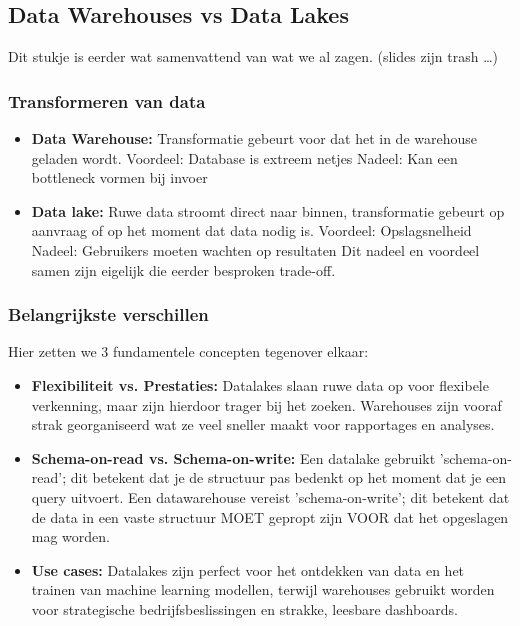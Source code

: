 \documentclass[a4paper,11pt,twoside]{report}
\begin{document}
\subsection{Data Warehouses vs Data Lakes}
Dit stukje is eerder wat samenvattend van wat we al zagen. (slides zijn trash \dots)
\subsubsection{Transformeren van data}
\begin{itemize}
    \item \textbf{Data Warehouse:} Transformatie gebeurt voor dat het in de warehouse geladen wordt.
          \newline
          {\color{green} Voordeel:} Database is extreem netjes
          \newline
          {\color{red} Nadeel:} Kan een bottleneck vormen bij invoer
    \item \textbf{Data lake:} Ruwe data stroomt direct naar binnen, transformatie gebeurt op
    aanvraag of op het moment dat data nodig is.
          \newline
          {\color{green} Voordeel:} Opslagsnelheid
          \newline
          {\color{red} Nadeel:} Gebruikers moeten wachten op resultaten
          \newline
          Dit nadeel en voordeel samen zijn eigelijk die eerder besproken trade-off.
\end{itemize}
\subsubsection{Belangrijkste verschillen}
Hier zetten we 3 fundamentele concepten tegenover elkaar:
\begin{itemize}
    \item \textbf{Flexibiliteit vs. Prestaties:} Datalakes slaan ruwe data op voor flexibele
    verkenning, maar zijn hierdoor trager bij het zoeken. Warehouses zijn vooraf strak georganiseerd
    wat ze veel sneller maakt voor rapportages en analyses.
    \item \textbf{Schema-on-read vs. Schema-on-write:} Een datalake gebruikt 'schema-on-read'; dit
    betekent dat je de structuur pas bedenkt op het moment dat je een query uitvoert. Een
    datawarehouse vereist 'schema-on-write'; dit betekent dat de data in een vaste structuur MOET
    gepropt zijn VOOR dat het opgeslagen mag worden.
    \item \textbf{Use cases:} Datalakes zijn perfect voor het ontdekken van data en het trainen van
    machine learning modellen, terwijl warehouses gebruikt worden voor strategische
    bedrijfsbeslissingen en strakke, leesbare dashboards.
\end{itemize}
\end{document}
